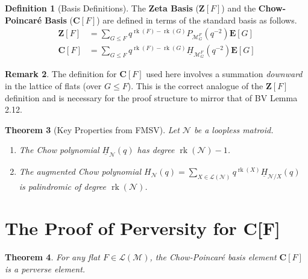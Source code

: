 \documentclass{article}
\newtheorem{theorem}{Theorem}
\theoremstyle{definition}
\newtheorem{definition}[theorem]{Definition}
\newtheorem{remark}[theorem]{Remark}
\newcommand{\matroid}[1]{\mathcal{#1}}
\newcommand{\Lattice}{\mathcal{L}}
\newcommand{\rank}{\operatorname{rk}}
\newcommand{\Zbasis}[1]{\mathbf{Z}[#1]}
\newcommand{\Cbasis}[1]{\mathbf{C}[#1]}
\newcommand{\Ebasis}[1]{\mathbf{E}[#1]}
\newcommand{\KLpoly}[1]{P_{#1}}
\newcommand{\Chowpoly}[1]{\underline{H}_{#1}}
\newcommand{\AugChowpoly}[1]{H_{#1}}
\begin{document}
\begin{definition}[Basis Definitions]
The \textbf{Zeta Basis} ($\Zbasis{F}$) and the \textbf{Chow-Poincaré Basis} ($\Cbasis{F}$) are defined in terms of the standard basis as follows.
\begin{align*}
    \Zbasis{F} &= \sum_{G \le F} q^{\rank(F)-\rank(G)} \KLpoly{\matroid{M}_G^F}(q^{-2}) \Ebasis{G} \\
    \Cbasis{F} &= \sum_{G \le F} q^{\rank(F)-\rank(G)} \Chowpoly{\matroid{M}_G^F}(q^{-2}) \Ebasis{G}
\end{align*}
\end{definition}

\begin{remark}
The definition for $\Cbasis{F}$ used here involves a summation \textit{downward} in the lattice of flats (over $G \le F$). This is the correct analogue of the $\Zbasis{F}$ definition and is necessary for the proof structure to mirror that of BV Lemma 2.12.
\end{remark}

\begin{theorem}[Key Properties from FMSV]
Let $\matroid{N}$ be a loopless matroid.
\begin{enumerate}
    \item The Chow polynomial $\Chowpoly{\matroid{N}}(q)$ has degree $\rank(\matroid{N})-1$.
    \item The augmented Chow polynomial $\AugChowpoly{\matroid{N}}(q) = \sum_{X \in \Lattice(\matroid{N})} q^{\rank(X)} \Chowpoly{\matroid{N}/X}(q)$ is palindromic of degree $\rank(\matroid{N})$.
\end{enumerate}
\end{theorem}

\section{The Proof of Perversity for C[F]}

\begin{theorem}
For any flat $F \in \Lattice(\matroid{M})$, the Chow-Poincaré basis element $\Cbasis{F}$ is a perverse element.
\end{theorem}
\end{document}
